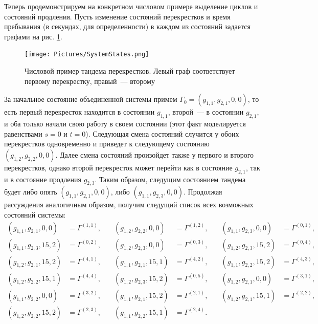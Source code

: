Теперь продемонстрируем на конкретном числовом примере выделение циклов и состояний продления. Пусть изменение состояний перекрестков и время пребывания (в секундах,  для определенности) в каждом из состояний задается графами на рис. \ref{SystemStates}.
\begin{figure}[h]\centering
\texttt{[image: Pictures/SystemStates.png]} 
\caption{Числовой пример тандема перекрестков. Левый граф соответствует первому перекрестку,  правый~--- второму}
\label{SystemStates}
\end{figure}
За начальное состояние объединенной системы примем $\Gamma_0=(g_{1,  1},  g_{2,  1},  0,  0)$,  то есть первый перекресток находится в состоянии $g_{1, 1}$,  второй~--- в состоянии $g_{2,  1}$,  и оба только начали свою работу в своем состоянии (этот факт моделируется равенствами $s=0$ и $t=0$). Следующая смена состояний случится у обоих перекрестков одновременно и приведет к следующему состоянию $(g_{1,  2},  g_{2,  2},  0,  0)$. Далее смена состояний произойдет также у первого и второго перекрестков,  однако второй перекресток может перейти как в состояние $g_{2,  1}$,  так и в состояние продления $g_{2,  3}$. Таким образом,  следущим состоянием тандема будет либо опять $(g_{1,  1},  g_{2,  1},  0,  0)$,  либо $(g_{1,  1},  g_{2,  3},  0,  0)$. Продолжая рассуждения аналогичным образом,  получим следущий список всех возможных состояний системы:
\begin{align*}
(g_{1,  1},  g_{2,  1},  0,  0)&=\Gamma^{(1,  1)} ,  & \quad (g_{1,  2},  g_{2,  2},  0,  0)&=\Gamma^{(1,  2)} ,  & \quad (g_{1,  1},  g_{2,  3},  0,  0)&=\Gamma^{(0,  1)},   \\
(g_{1,  1},  g_{2,  3},  15,  2)&=\Gamma^{(0,  2)} ,  & \quad (g_{1,  2},  g_{2,  3},  0,  0)&=\Gamma^{(0,  3)} ,  & \quad (g_{1,  2},  g_{2,  3},  15,  2)&=\Gamma^{(0,  4)},   \\
(g_{1,  2},  g_{2,  1},  15,  2)&=\Gamma^{(4,  1)} ,  & \quad (g_{1,  1},  g_{2,  1},  15,  1)&=\Gamma^{(4,  2)} ,  & \quad (g_{1,  1},  g_{2,  2},  15,  2)&=\Gamma^{(4,  3)},   \\
(g_{1,  2},  g_{2,  2},  15,  1)&=\Gamma^{(4,  4)} ,  & \quad (g_{1,  2},  g_{2,  3},  15,  2)&=\Gamma^{(0,  5)} ,  & \quad (g_{1,  2},  g_{2,  1},  0,  0)&=\Gamma^{(3,  1)},   \\
(g_{1,  1},  g_{2,  2},  0,  0)&=\Gamma^{(3,  2)} ,  & \quad (g_{1,   1},  g_{2,  1},  15,  2)&=\Gamma^{(2,  1)} ,  & \quad (g_{1,  2},  g_{2,  1},  15,  1)&=\Gamma^{(2,  2)},   \\
(g_{1,  2},  g_{2,  2},  15,  2)&=\Gamma^{(2,  3)} ,  & \quad (g_{1,  1},  g_{2,  2},  15,  1)&=\Gamma^{(2,  4)}. & &
\end{align*}
